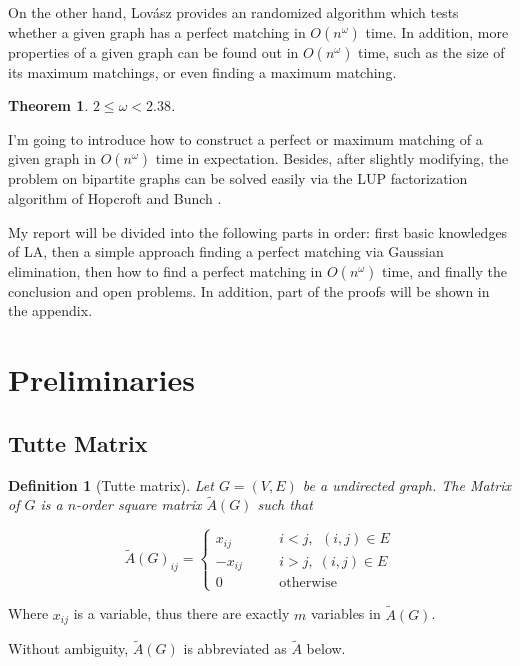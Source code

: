 \documentclass{article}
\newtheorem*{definition}{Definition}
\newtheorem{theorem}{Theorem}
\begin{document}
		On the other hand, Lov\'asz  provides an randomized algorithm which tests whether a given graph has a perfect matching in $O(n^\omega)$ time. In addition, more properties of a given graph can be found out in $O(n^\omega)$ time, such as the size of its maximum matchings, or even finding a maximum matching.

		\begin{theorem}
			$2 \le \omega < 2.38$.
		\end{theorem}

		I'm going to introduce how to construct a perfect or maximum matching of a given graph in $O(n^\omega)$ time in expectation. Besides, after slightly modifying, the problem on bipartite graphs can be solved easily via the LUP factorization algorithm of Hopcroft and Bunch  .

		My report will be divided into the following parts in order: first basic knowledges of LA, then a simple approach finding a perfect matching via Gaussian elimination, then how to find a perfect matching in $O(n^\omega)$ time, and finally the conclusion and open problems. In addition, part of the proofs will be shown in the appendix.
	
	\section{Preliminaries}

		\subsection{Tutte Matrix}

			\begin{definition}[Tutte matrix]
				Let $G=(V,E)$ be a undirected graph. The  Matrix of $G$ is a $n$-order square matrix $\tilde A(G)$ such that

				$$ \tilde A(G)_{ij} = \left\{ \begin{aligned} x_{ij} & \quad & i<j,\,\; (i,j)\in E \\ -x_{ij} & \quad & i > j,\; (i,j) \in E \\ 0 & \quad & \text{otherwise}\end{aligned} \right. $$
			\end{definition}

			Where $x_{ij}$ is a variable, thus there are exactly $m$ variables in $\tilde A(G)$.

			Without ambiguity, $\tilde A(G)$ is abbreviated as $\tilde A$ below.
\end{document}
